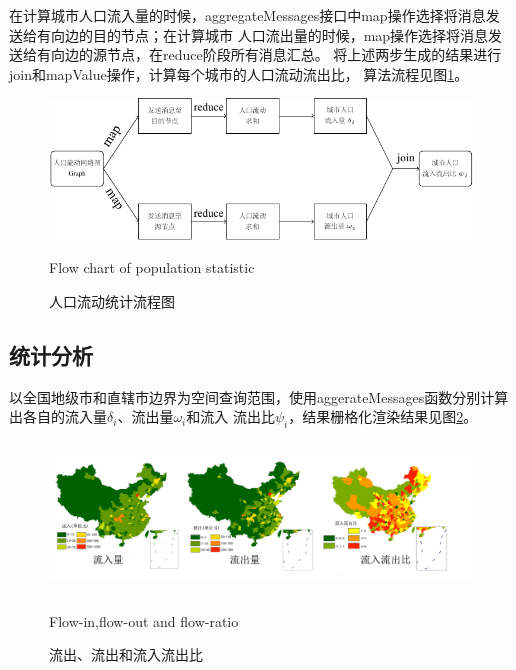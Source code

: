 在计算城市人口流入量的时候，aggregateMessages接口中map操作选择将消息发送给有向边的目的节点；在计算城市
人口流出量的时候，map操作选择将消息发送给有向边的源节点，在reduce阶段所有消息汇总。
将上述两步生成的结果进行join和mapValue操作，计算每个城市的人口流动流出比，
算法流程见图\ref{fig:populationstatistic}。
\begin{figure}
  \centering
  \includegraphics[width=0.9 \linewidth]{figures/population_statistic.pdf} \\
  \caption{人口流动统计流程图}{Flow chart of population statistic}
  \label{fig:populationstatistic}
\end{figure}

\subsection{统计分析}
以全国地级市和直辖市边界为空间查询范围，使用aggerateMessages函数分别计算出各自的流入量$\delta_i$、流出量$\omega_i$和流入
流出比$\psi_i$，结果栅格化渲染结果见图\ref{fig:flowinout}。
\begin{figure}
  \centering
  \includegraphics[width=13cm,height=4cm]{figures/flowratio.png} \\
  \caption{流出、流出和流入流出比}{Flow-in,flow-out and flow-ratio}
  \label{fig:flowinout}
\end{figure}

